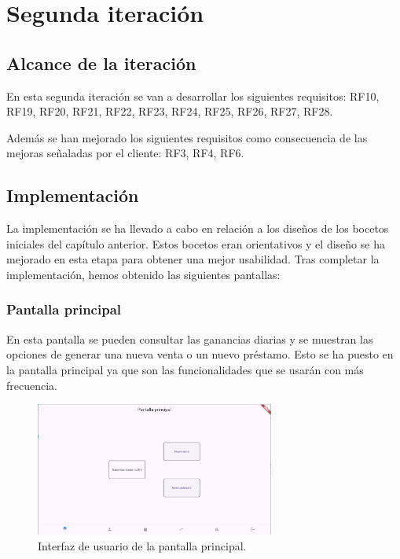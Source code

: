 \newpage

\section{Segunda iteración}

\subsection{Alcance de la iteración}

En esta segunda iteración se van a desarrollar los siguientes requisitos: RF10, RF19, RF20, RF21, RF22, RF23, RF24, RF25, RF26, RF27, RF28. 

Además se han mejorado los siguientes requisitos como consecuencia de las mejoras señaladas por el cliente: RF3, RF4, RF6.

\subsection{Implementación}

La implementación se ha llevado a cabo en relación a los diseños de los bocetos iniciales del capítulo anterior. Estos bocetos eran orientativos y el diseño se ha mejorado en esta etapa para obtener una mejor usabilidad. Tras completar la implementación, hemos obtenido las siguientes pantallas: 

\subsubsection{Pantalla principal}

En esta pantalla se pueden consultar las ganancias diarias y se muestran las opciones de generar una nueva venta o un nuevo préstamo. Esto se ha puesto en la pantalla principal ya que son las funcionalidades que se usarán con más frecuencia. 

\begin{figure}[H]
	\centering
	\includegraphics[width=0.7\textwidth]{imagenes/SegundaIteracion/pantallaPrincipal.png}
	\caption{Interfaz de usuario de la pantalla principal.}
	\label{fig:appPantallaPrincipal}
\end{figure}

